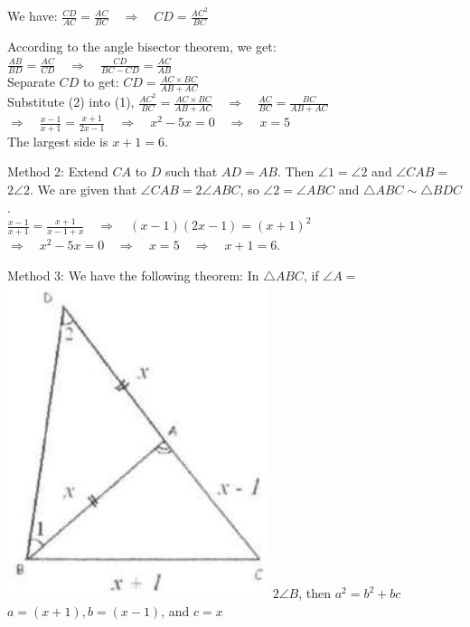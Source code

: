 \documentclass[10pt]{article}
\begin{document}
We have: \(\frac{C D}{A C}=\frac{A C}{B C} \quad \Rightarrow \quad C D=\frac{A C^{2}}{B C}\)

According to the angle bisector theorem, we get:\\
\(\frac{A B}{B D}=\frac{A C}{C D} \quad \Rightarrow \quad \frac{C D}{B C-C D}=\frac{A C}{A B}\)\\
Separate \(C D\) to get: \(C D=\frac{A C \times B C}{A B+A C}\)\\
Substitute (2) into (1), \(\frac{A C^{2}}{B C}=\frac{A C \times B C}{A B+A C} \quad \Rightarrow \quad \frac{A C}{B C}=\frac{B C}{A B+A C}\)\\
\(\Rightarrow \quad \frac{x-1}{x+1}=\frac{x+1}{2 x-1} \quad \Rightarrow \quad x^{2}-5 x=0 \quad \Rightarrow \quad x=5\)\\
The largest side is \(x+1=6\).

Method 2: Extend \(C A\) to \(D\) such that \(A D=A B\). Then \(\angle 1=\angle 2\) and \(\angle C A B=\) \(2 \angle 2\). We are given that \(\angle C A B=2 \angle A B C\), so \(\angle 2=\angle A B C\) and \(\triangle A B C \sim \triangle B D C\).\\
\(\frac{x-1}{x+1}=\frac{x+1}{x-1+x} \quad \Rightarrow \quad(x-1)(2 x-1)=(x+1)^{2}\)\\
\(\Rightarrow \quad x^{2}-5 x=0 \quad \Rightarrow \quad x=5 \quad \Rightarrow \quad x+1=6\).

Method 3: We have the following theorem: In \(\triangle A B C\), if \(\angle A=\)\\
\includegraphics[max width=\textwidth]{2025_04_17_97bc1f7e44d93c271a88g-073} \(2 \angle B\), then \(a^{2}=b^{2}+b c\)\\
\(a=(x+1), b=(x-1)\), and \(c=x\)
\end{document}
